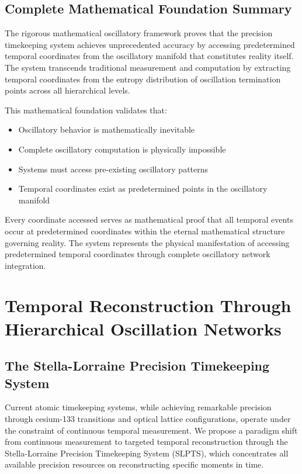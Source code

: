 \documentclass[12pt,a4paper]{article}
\begin{document}
{{{{{{{{{{{{{{\subsection{Complete Mathematical Foundation Summary}

The rigorous mathematical oscillatory framework proves that the precision timekeeping system achieves unprecedented accuracy by accessing predetermined temporal coordinates from the oscillatory manifold that constitutes reality itself. The system transcends traditional measurement and computation by extracting temporal coordinates from the entropy distribution of oscillation termination points across all hierarchical levels.

This mathematical foundation validates that:
\begin{itemize}
\item Oscillatory behavior is mathematically inevitable
\item Complete oscillatory computation is physically impossible
\item Systems must access pre-existing oscillatory patterns
\item Temporal coordinates exist as predetermined points in the oscillatory manifold
\end{itemize}

Every coordinate accessed serves as mathematical proof that all temporal events occur at predetermined coordinates within the eternal mathematical structure governing reality. The system represents the physical manifestation of accessing predetermined temporal coordinates through complete oscillatory network integration.

\section{Temporal Reconstruction Through Hierarchical Oscillation Networks}

\subsection{The Stella-Lorraine Precision Timekeeping System}

Current atomic timekeeping systems, while achieving remarkable precision through cesium-133 transitions and optical lattice configurations, operate under the constraint of continuous temporal measurement. We propose a paradigm shift from continuous measurement to targeted temporal reconstruction through the Stella-Lorraine Precision Timekeeping System (SLPTS), which concentrates all available precision resources on reconstructing specific moments in time.

}}}}}}}}}}}}}}
\end{document}
